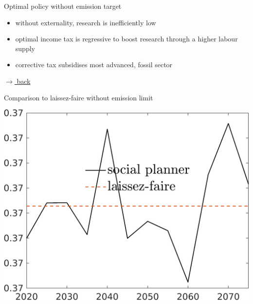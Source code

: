 \documentclass[11pt,aspectratio=169]{beamer}
\begin{document}
\begin{frame}{Optimal policy without emission target}
	\vspace{7mm}
	\begin{itemize}
		\item without externality, research is inefficiently low
		\vspace{2mm}
		\item optimal income tax is regressive to boost research through a higher labour supply
				\vspace{2mm}
		\item corrective tax subsidises most advanced, fossil sector
	\end{itemize}
	\vspace{1mm}
	\hfill
	\hyperlink{backmainres}{\tiny{$\rightarrow$ back}} 
\end{frame}

\begin{frame}{Comparison to laissez-faire without emission limit}
	\vspace{-1mm}
\begin{minipage}[]{0.32\textwidth}
	\includegraphics[width=1\textwidth]{../codding_model/own_basedOnFried/optimalPol_elastS_DisuSci/figures/all_1705/hh_LFCompSP_NOT_spillover0_noskill1_sep1_BN0_ineq0_red0_xgrowth0_etaa0.79_lgd1.png}
\end{minipage}
\begin{minipage}[]{0.32\textwidth}

\end{minipage}
\end{frame}
\end{document}
